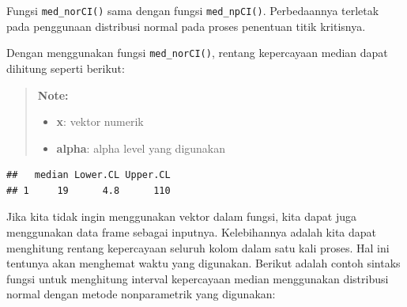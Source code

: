 \documentclass[]{book}
\newenvironment{Shaded}{\begin{snugshade}}{\end{snugshade}}
\newcommand{\KeywordTok}[1]{\textcolor[rgb]{0.13,0.29,0.53}{\textbf{#1}}}
\newcommand{\DataTypeTok}[1]{\textcolor[rgb]{0.13,0.29,0.53}{#1}}
\newcommand{\FloatTok}[1]{\textcolor[rgb]{0.00,0.00,0.81}{#1}}
\newcommand{\OperatorTok}[1]{\textcolor[rgb]{0.81,0.36,0.00}{\textbf{#1}}}
\newcommand{\NormalTok}[1]{#1}
\providecommand{\tightlist}{%
  \setlength{\itemsep}{0pt}\setlength{\parskip}{0pt}}
\begin{document}
Fungsi \texttt{med\_norCI()} sama dengan fungsi \texttt{med\_npCI()}.
Perbedaannya terletak pada penggunaan distribusi normal pada proses
penentuan titik kritisnya.

Dengan menggunakan fungsi \texttt{med\_norCI()}, rentang kepercayaan
median dapat dihitung seperti berikut:

\begin{quote}
\textbf{Note: }

\begin{itemize}
\tightlist
\item
  \textbf{x}: vektor numerik
\item
  \textbf{alpha}: alpha level yang digunakan
\end{itemize}
\end{quote}

\begin{Shaded}
\end{Shaded}

\begin{verbatim}
##   median Lower.CL Upper.CL
## 1     19      4.8      110
\end{verbatim}

Jika kita tidak ingin menggunakan vektor dalam fungsi, kita dapat juga
menggunakan data frame sebagai inputnya. Kelebihannya adalah kita dapat
menghitung rentang kepercayaan seluruh kolom dalam satu kali proses. Hal
ini tentunya akan menghemat waktu yang digunakan. Berikut adalah contoh
sintaks fungsi untuk menghitung interval kepercayaan median menggunakan
distribusi normal dengan metode nonparametrik yang digunakan:
\end{document}
